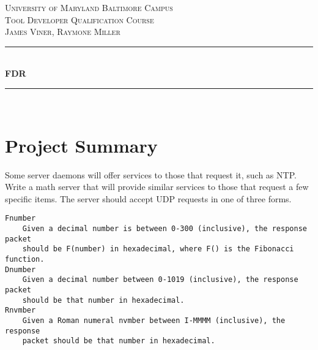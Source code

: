 \documentclass[12pt]{article}
\begin{document}
	\begin{titlepage}
	\newcommand{\HRule}{\rule{\linewidth}{0.5mm}} %

	\center %


	\textsc{\Large University of Maryland Baltimore Campus}\\[1.5cm] %
	\textsc{\Large Tool Developer Qualification Course}\\[0.5cm] %
	\textsc{\large James Viner, Raymone Miller}\\[0.5cm] %


	\HRule \\[0.4cm]
		\huge \bfseries FDR\\[0.4cm] %
	\HRule \\[1.5cm]
	\end{titlepage}
	\tableofcontents
	\newpage
	\section{Project Summary}
		Some server daemons will offer services to those that request
		it, such as NTP. Write a math server that will provide similar
		services to those that request a few specific items. The server
		should accept UDP requests in one of three forms.
		\begin{lstlisting}
Fnumber
    Given a decimal number is between 0-300 (inclusive), the response packet
    should be F(number) in hexadecimal, where F() is the Fibonacci function.
Dnumber
    Given a decimal number between 0-1019 (inclusive), the response packet
    should be that number in hexadecimal.
Rnvmber
    Given a Roman numeral nvmber between I-MMMM (inclusive), the response
    packet should be that number in hexadecimal.
		\end{lstlisting}
\end{document}
